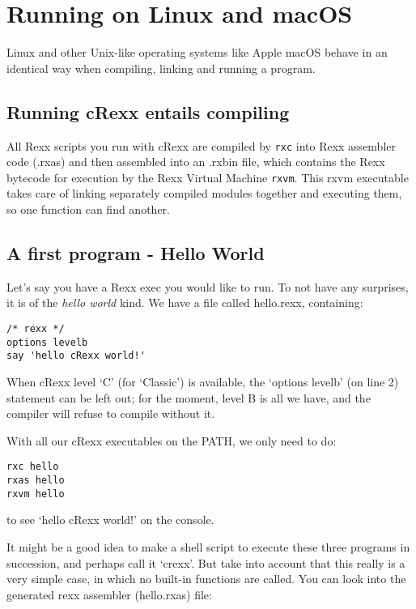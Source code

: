 \chapter{Running \crexx{} on Linux and macOS}

Linux and other Unix-like operating systems like Apple macOS behave in
an identical way when compiling, linking and running a \crexx{}
program.

\hypertarget{running-crexx-entails-compiling}{%
\section{Running cRexx entails
compiling}\label{running-crexx-entails-compiling}}

All Rexx scripts you run with cRexx are compiled by \texttt{rxc} into
Rexx assembler code (.rxas) and then assembled into an .rxbin file,
which contains the Rexx bytecode for execution by the Rexx Virtual
Machine \texttt{rxvm}. This rxvm executable takes care of linking
separately compiled modules together and executing them, so one function
can find another.

\hypertarget{a-first-program---hello-world}{%
\section{A first program - Hello
World}\label{a-first-program---hello-world}}

Let's say you have a Rexx exec you would like to run. To not have any
surprises, it is of the \emph{hello world} kind. We have a file called
hello.rexx, containing:

\begin{verbatim}
/* rexx */
options levelb
say 'hello cRexx world!'
\end{verbatim}

When cRexx level `C' (for `Classic') is available, the `options levelb'
(on line 2) statement can be left out; for the moment, level B is all we
have, and the compiler will refuse to compile without it.

With all our cRexx executables on the PATH, we only need to do:

\begin{verbatim}
rxc hello
rxas hello
rxvm hello
\end{verbatim}

to see `hello cRexx world!' on the console.

It might be a good idea to make a shell script to execute these three
programs in succession, and perhaps call it `crexx'. But take into
account that this really is a very simple case, in which no built-in
functions are called. You can look into the generated rexx assembler
(hello.rxas) file:


